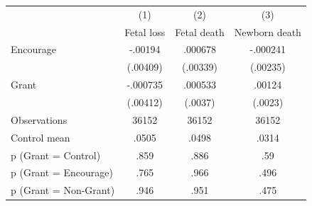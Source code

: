 \begin{tabular*}{\hsize}{@{\hskip\tabcolsep\extracolsep\fill}l*{3}{c}}
\toprule
                    &\multicolumn{1}{c}{(1)}&\multicolumn{1}{c}{(2)}&\multicolumn{1}{c}{(3)}\\
                    &\multicolumn{1}{c}{Fetal loss}&\multicolumn{1}{c}{Fetal death}&\multicolumn{1}{c}{Newborn death}\\
\midrule
Encourage           &     -.00194&     .000678&    -.000241\\
                    &    (.00409)&    (.00339)&    (.00235)\\
\addlinespace
Grant               &    -.000735&     .000533&      .00124\\
                    &    (.00412)&     (.0037)&     (.0023)\\
\midrule
Observations        &       36152&       36152&       36152\\
Control mean        &       .0505&       .0498&       .0314\\
p (Grant = Control) &        .859&        .886&         .59\\
p (Grant = Encourage)&        .765&        .966&        .496\\
p (Grant = Non-Grant)&        .946&        .951&        .475\\
\bottomrule
\end{tabular*}
